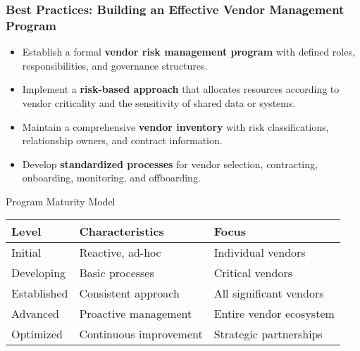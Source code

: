 \documentclass{beamer}
\begin{document}
\begin{frame}
    \frametitle{Best Practices: Building an Effective Vendor Management Program}
    
    \begin{itemize}
        \item Establish a formal \textbf{vendor risk management program} with defined roles, responsibilities, and governance structures.
        \item Implement a \textbf{risk-based approach} that allocates resources according to vendor criticality and the sensitivity of shared data or systems.
        \item Maintain a comprehensive \textbf{vendor inventory} with risk classifications, relationship owners, and contract information.
        \item Develop \textbf{standardized processes} for vendor selection, contracting, onboarding, monitoring, and offboarding.
    \end{itemize}
    
    \begin{block}{Program Maturity Model}
        \scriptsize
        \begin{tabular}{lll}
            \textbf{Level} & \textbf{Characteristics} & \textbf{Focus} \\
            \hline
            Initial & Reactive, ad-hoc & Individual vendors \\
            Developing & Basic processes & Critical vendors \\
            Established & Consistent approach & All significant vendors \\
            Advanced & Proactive management & Entire vendor ecosystem \\
            Optimized & Continuous improvement & Strategic partnerships \\
        \end{tabular}
    \end{block}
\end{frame}
\end{document}
